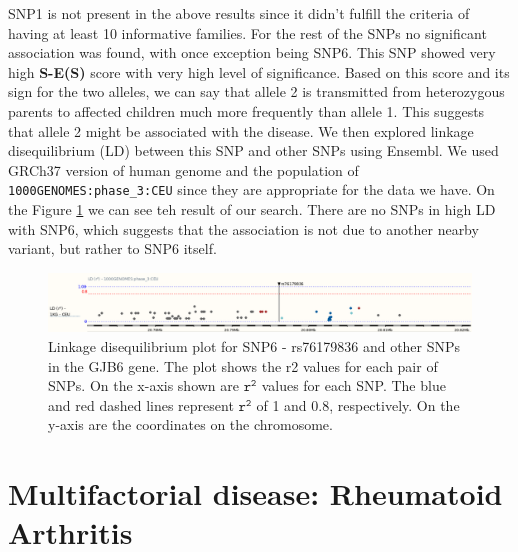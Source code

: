 \documentclass[a4paper,12pt]{article}
\begin{document}
SNP1 is not present in the above results since it didn't fulfill the criteria of having at least 10 informative families. 
For the rest of the SNPs no significant association was found, with once exception being SNP6. This SNP showed very high \textbf{S-E(S)} 
score with very high level of significance. Based on this score and its sign for the two alleles, we can say that allele 2 is transmitted from 
heterozygous parents to affected children much more frequently than allele 1. This suggests that allele 2 might be associated with 
the disease.
We then explored linkage disequilibrium (LD) between this SNP and other SNPs using Ensembl. We used GRCh37 version of human genome and the 
population of \texttt{1000GENOMES:phase\_3:CEU} since they are appropriate for the data we have. On the Figure \ref{fig:ld_plot} we 
can see teh result of our search. There are no SNPs in high LD with SNP6, which suggests that the association is not due to another nearby 
variant, but rather to SNP6 itself.

\begin{figure}[ht]
    \centering
    \includegraphics[width=\textwidth]{images/fbat_Ensembl_thin.png}
    \caption{Linkage disequilibrium plot for SNP6 - rs76179836 and other SNPs in the GJB6 gene. The plot shows the r2 values for 
    each pair of SNPs. On the x-axis shown are $\mathtt{r^2}$ values for each SNP. The blue and red dashed lines represent $\mathtt{r^2}$ of 1 
    and 0.8, respectively. On the y-axis are the coordinates on the chromosome.}
    \label{fig:ld_plot}
\end{figure}

\newpage
    \section{Multifactorial disease: Rheumatoid Arthritis}
\end{document}
